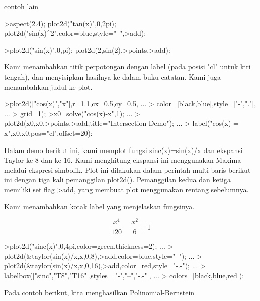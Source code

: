 \documentclass[a4paper,10pt]{article}
\begin{document}
\begin{eulernotebook}
\begin{eulercomment}
\begin{eulercomment}
\begin{eulercomment}
\end{eulercomment}
\eulersubheading{}
\begin{eulercomment}
contoh lain
\end{eulercomment}
\begin{eulerprompt}
>aspect(2.4); plot2d("tan(x)",0,2pi); plot2d("sin(x)^2",color=blue,style="--",>add):
\end{eulerprompt}
\eulersubheading{}
\begin{eulerprompt}
>plot2d("sin(x)",0,pi); plot2d(2,sin(2),>points,>add):
\end{eulerprompt}
\begin{eulercomment}
Kami menambahkan titik perpotongan dengan label (pada posisi "cl"
untuk kiri tengah), dan menyisipkan hasilnya ke dalam buku catatan.
Kami juga menambahkan judul ke plot.
\end{eulercomment}
\begin{eulerprompt}
>plot2d(["cos(x)","x"],r=1.1,cx=0.5,cy=0.5, ...
>  color=[black,blue],style=["-","."], ...
>  grid=1);
>x0=solve("cos(x)-x",1);  ...
>  plot2d(x0,x0,>points,>add,title="Intersection Demo");  ...
>  label("cos(x) = x",x0,x0,pos="cl",offset=20):
\end{eulerprompt}
\begin{eulercomment}
Dalam demo berikut ini, kami memplot fungsi sinc(x)=sin(x)/x dan
ekspansi Taylor ke-8 dan ke-16. Kami menghitung ekspansi ini
menggunakan Maxima melalui ekspresi simbolik. Plot ini dilakukan dalam
perintah multi-baris berikut ini dengan tiga kali pemanggilan
plot2d(). Pemanggilan kedua dan ketiga memiliki set flag \textgreater{}add, yang
membuat plot menggunakan rentang sebelumnya. 

Kami menambahkan kotak label yang menjelaskan fungsinya.
\end{eulercomment}
\begin{eulerformula}
\[
\frac{x^4}{120}-\frac{x^2}{6}+1
\]
\end{eulerformula}
\begin{eulerprompt}
>plot2d("sinc(x)",0,4pi,color=green,thickness=2); ...
>  plot2d(&taylor(sin(x)/x,x,0,8),>add,color=blue,style="--"); ...
>  plot2d(&taylor(sin(x)/x,x,0,16),>add,color=red,style="-.-"); ...
>  labelbox(["sinc","T8","T16"],styles=["-","--","-.-"], ...
>    colors=[black,blue,red]):
\end{eulerprompt}
\begin{eulercomment}
Pada contoh berikut, kita menghasilkan Polinomial-Bernstein


\end{eulercomment}
\end{eulercomment}
\end{eulercomment}
\end{eulernotebook}
\end{document}
